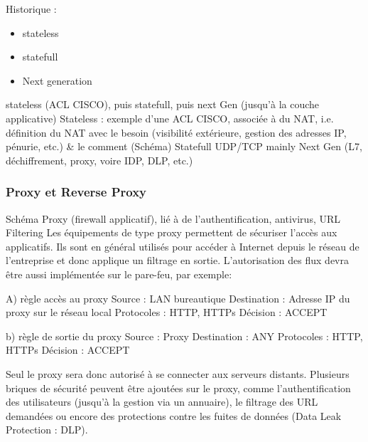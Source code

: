 Historique : 
\begin{itemize}
    \item stateless
    \item statefull
    \item Next generation
\end{itemize}

stateless (ACL CISCO), puis statefull, puis next Gen (jusqu’à la couche applicative)
Stateless : exemple d’une ACL CISCO, associée à du NAT, i.e. définition du NAT avec le besoin (visibilité extérieure, gestion des adresses IP, pénurie, etc.) \& le comment (Schéma)
Statefull UDP/TCP mainly
Next Gen (L7, déchiffrement, proxy, voire IDP, DLP, etc.)


\subsubsection{Proxy et Reverse Proxy}
Schéma Proxy (firewall applicatif), lié à de l’authentification, antivirus, URL Filtering
Les équipements de type proxy permettent de sécuriser l'accès aux applicatifs.
Ils sont en général utilisés pour accéder à Internet depuis le réseau de l'entreprise et donc applique un filtrage en sortie.
L'autorisation des flux devra être aussi implémentée sur le pare-feu, par exemple:

A) règle accès au proxy
Source : LAN bureautique
Destination : Adresse IP du proxy sur le réseau local
Protocoles : HTTP, HTTPs
Décision : ACCEPT

b) règle de sortie du proxy
Source : Proxy
Destination : ANY
Protocoles : HTTP, HTTPs
Décision : ACCEPT

Seul le proxy sera donc autorisé à se connecter aux serveurs distants.
Plusieurs briques de sécurité peuvent être ajoutées sur le proxy, comme l'authentification des utilisateurs (jusqu'à la gestion via un annuaire), le filtrage des URL demandées ou encore des protections contre les fuites de données (Data Leak Protection : DLP).

